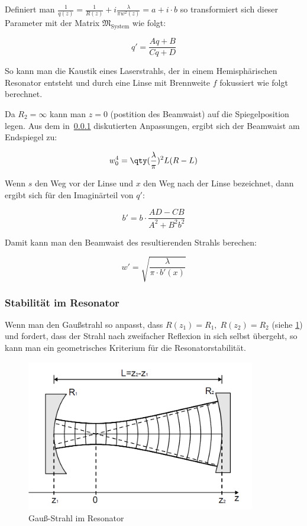 \documentclass[slug=GL, room=HZDR\ Dresden/Rossendorf\,\ Geb.\ 620/123, supervisor=Tim\ Ziegler]{../../Lab_Report_LaTeX/lab_report}
\begin{document}
Definiert man \(\frac{1}{q(z)}=\frac{1}{R(z)}+i\frac{\lambda}{\pi
  w^2(z)}=a+i\cdot b\) so transformiert sich dieser Parameter mit der Matrix
\(\mathfrak{M}_{\text{System}}\) wie folgt:

\begin{equation}
  \label{eq:qtrans}
  q'=\frac{Aq + B}{Cq+D}
\end{equation}

So kann man die Kaustik eines Laserstrahls, der in einem
Hemisph\"arischen Resonator entsteht und durch eine Linse mit
Brennweite \(f\) fokussiert wie folgt berechnet.

Da \(R_2=\infty\) kann man \(z=0\) (postition des Beamwaist) auf die
Spiegelposition legen.  Aus dem in~\ref{sec:stabres} diskutierten
Anpassungen, ergibt sich der Beamwaist am Endspiegel zu:

\begin{equation}
  \label{eq:konfwaist}
  w_0^4=\qty(\frac{\lambda}{\pi})^2L(R-L)
\end{equation}

Wenn \(s\) den Weg vor der Linse und \(x\) den Weg nach der Linse
bezeichnet, dann ergibt sich f\"ur den Imagin\"arteil von \(q'\):

\begin{equation}
  \label{eq:qkaust}
  b'=b\cdot\frac{AD-CB}{A^2+B^2b^2}
\end{equation}

Damit kann man den Beamwaist des resultierenden Strahls berechen:

\begin{equation}
  \label{eq:reswaist}
  w'=\sqrt{\frac{\lambda}{\pi\cdot b'(x)}}
\end{equation}


\subsubsection{Stabilit\"at im Resonator}
\label{sec:stabres}

Wenn man den Gau\ss{}strahl so anpasst, dass \(R(z_1)=R_1,\;
R(z_2)=R_2\) (siehe \ref{fig:gauss-res}) und fordert, dass der Strahl
nach zweifacher Reflexion in sich selbst \"ubergeht, so kann man ein
geometrisches Kriterium f\"ur die Resonatorstabilit\"at.

\begin{figure}
  \includegraphics[width=10cm]{gauss-res.png}
  \caption[Gauss]{Gau\ss{}-Strahl im Resonator}
  \label{fig:gauss-res}
\end{figure}
\end{document}
